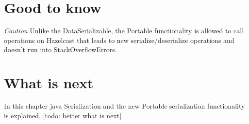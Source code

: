 \section{Good to know}

\emph{Caution}  Unlike the DataSerializable, the Portable functionality is allowed to call operations on Hazelcast that leads to new serialize/deserialize operations and doesn't run into StackOverflowErrors.

\section{What is next}
In this chapter java Serialization and the new Portable serialization functionality is explained. [todo: better what is next]